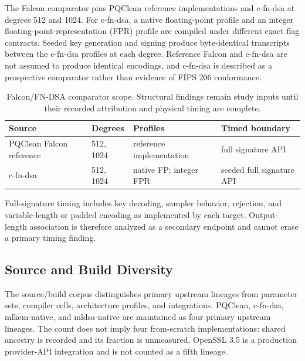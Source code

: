 \documentclass[cryptography,article,submit,moreauthors]{Definitions/mdpi}
\begin{document}
The Falcon comparator pins PQClean reference implementations and c-fn-dsa at
degrees 512 and 1024. For c-fn-dsa, a native floating-point profile and an
integer floating-point-representation (FPR) profile are compiled under
different exact flag contracts. Seeded key generation and signing produce
byte-identical transcripts between the c-fn-dsa profiles at each degree.
Reference Falcon and c-fn-dsa are not assumed to produce identical encodings,
and c-fn-dsa is described as a prospective comparator rather than evidence of
FIPS 206 conformance.

\begin{table}[H]
\caption{Falcon/FN-DSA comparator scope. Structural findings remain study inputs until their recorded attribution and physical timing are complete.\label{tab:falcon-scope}}
\begin{tabularx}{\textwidth}{LLLL}
\toprule
\textbf{Source} & \textbf{Degrees} & \textbf{Profiles} & \textbf{Timed boundary}\\
\midrule
PQClean Falcon reference & 512, 1024 & reference implementation & full signature API\\
c-fn-dsa & 512, 1024 & native FP; integer FPR & seeded full signature API\\
\bottomrule
\end{tabularx}
\end{table}

Full-signature timing includes key decoding, sampler behavior, rejection, and
variable-length or padded encoding as implemented by each target. Output-length
association is therefore analyzed as a secondary endpoint and cannot erase a
primary timing finding.

\subsection{Source and Build Diversity}

The source/build corpus distinguishes primary upstream lineages from parameter
sets, compiler cells, architecture profiles, and integrations. PQClean,
c-fn-dsa, mlkem-native, and mldsa-native are maintained as four primary
upstream lineages. The count does not imply four from-scratch implementations:
shared ancestry is recorded and its fraction is unmeasured. OpenSSL 3.5 is a
production provider-API integration and is not counted as a fifth lineage.
\end{document}
